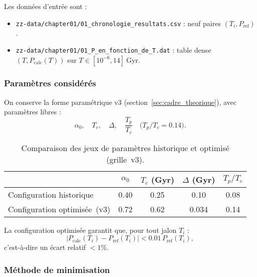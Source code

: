 Les données d’entrée sont :
\begin{itemize}
  \item \texttt{zz-data/chapter01/01\_chronologie\_resultats.csv} :
        neuf paires \((T_i,P_{\mathrm{ref}})\).
  \item \texttt{zz-data/chapter01/01\_P\_en\_fonction\_de\_T.dat} :
        table dense \((T,P_{\mathrm{calc}}(T))\) sur \(T\in[10^{-6},14]\) Gyr.
\end{itemize}

\subsubsection{Paramètres considérés}
On conserve la forme paramétrique v3 (section~\ref{sec:cadre_theorique}),
avec paramètres libres :
\[
  \alpha_{0},\quad T_{c},\quad \Delta,\quad \frac{T_{p}}{T_{c}}\quad\bigl(T_{p}/T_{c}=0.14\bigr).
\]

\begin{table}[htbp]
  \centering
  \begin{tabular}{l S S S S}
    \toprule
     & {$\alpha_{0}$} & {$T_{c}$ (Gyr)} & {$\Delta$ (Gyr)} & {$T_{p}/T_{c}$} \\
    \midrule
    Configuration historique   & 0.40  & 0.25   & 0.10   & 0.08 \\
    Configuration optimisée~(v3) & 0.72  & 0.62   & 0.034  & 0.14 \\
    \bottomrule
  \end{tabular}
  \caption{Comparaison des jeux de paramètres historique et optimisé (grille~v3).}
  \label{tab:parametres_calibration}
\end{table}

La configuration optimisée garantit que, pour tout jalon \(T_{i}\) :
\[
  \bigl|P_{\mathrm{calc}}(T_{i}) - P_{\mathrm{ref}}(T_{i})\bigr|
  < 0.01\,P_{\mathrm{ref}}(T_{i}),
\]
c’est-à-dire un écart relatif \(<1\%\).

\subsubsection{Méthode de minimisation}

